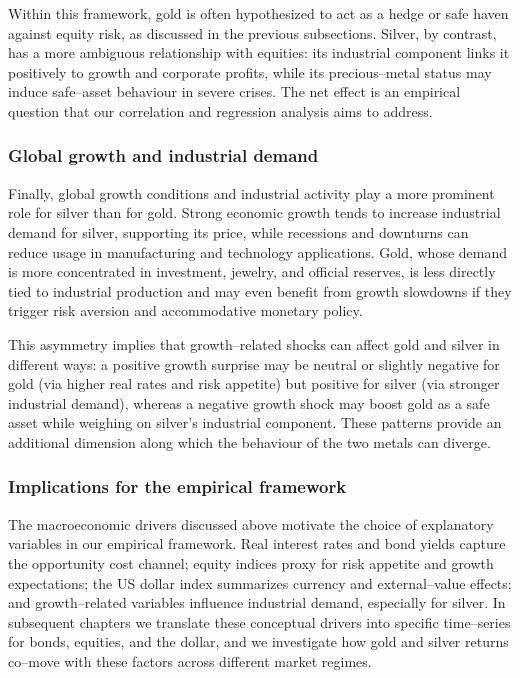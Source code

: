 Within this framework, gold is often hypothesized to act as a hedge or safe haven against
equity risk, as discussed in the previous subsections. Silver, by contrast, has a more
ambiguous relationship with equities: its industrial component links it positively to
growth and corporate profits, while its precious–metal status may induce safe–asset
behaviour in severe crises. The net effect is an empirical question that our correlation
and regression analysis aims to address.
\subsubsection{Global growth and industrial demand}

Finally, global growth conditions and industrial activity play a more prominent role for
silver than for gold. Strong economic growth tends to increase industrial demand for
silver, supporting its price, while recessions and downturns can reduce usage in
manufacturing and technology applications. Gold, whose demand is more concentrated in
investment, jewelry, and official reserves, is less directly tied to industrial production
and may even benefit from growth slowdowns if they trigger risk aversion and accommodative
monetary policy.

This asymmetry implies that growth–related shocks can affect gold and silver in different
ways: a positive growth surprise may be neutral or slightly negative for gold (via higher
real rates and risk appetite) but positive for silver (via stronger industrial demand),
whereas a negative growth shock may boost gold as a safe asset while weighing on silver’s
industrial component. These patterns provide an additional dimension along which the
behaviour of the two metals can diverge.
\subsubsection{Implications for the empirical framework}

The macroeconomic drivers discussed above motivate the choice of explanatory variables in
our empirical framework. Real interest rates and bond yields capture the opportunity cost
channel; equity indices proxy for risk appetite and growth expectations; the US dollar
index summarizes currency and external–value effects; and growth–related variables
influence industrial demand, especially for silver. In subsequent chapters we translate
these conceptual drivers into specific time–series for bonds, equities, and the dollar,
and we investigate how gold and silver returns co–move with these factors across different
market regimes.

